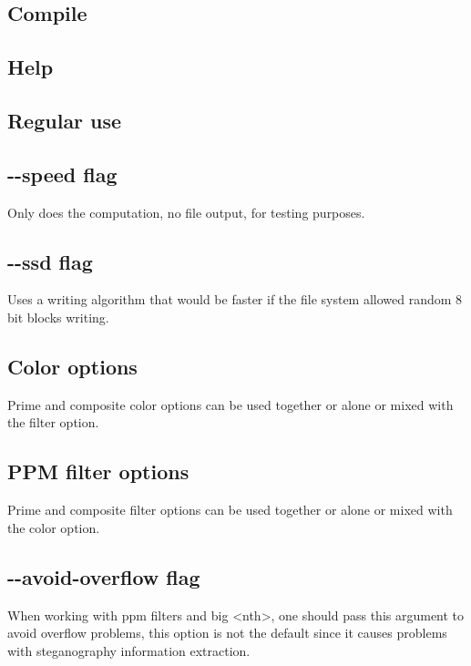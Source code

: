 \subsection{Compile}



\subsection{Help}



\subsection{Regular use}


\subsection{-{}-speed flag}
Only does the computation, no file output, for testing purposes.



\subsection{-{}-ssd flag}
Uses a writing algorithm that would be faster if the file system allowed random 8 bit blocks writing.



\subsection{Color options}
Prime and composite color options can be used together or alone or mixed with the filter option.


\subsection{PPM filter options}
Prime and composite filter options can be used together or alone or mixed with the color option.


\subsection{-{}-avoid-overflow flag}
When working with ppm filters and big <nth>, one should pass this argument to avoid overflow problems, this option is not the default since it causes problems with steganography information extraction.


